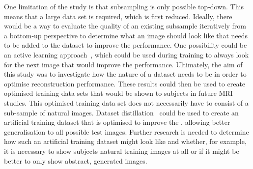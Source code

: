 One limitation of the study is that subsampling is only possible top-down. This means that a large data set is required, which is first reduced. Ideally, there would be a way to evaluate the quality of an existing subsample iteratively from a bottom-up perspective  to determine what an image should look like that needs to be added to the dataset to improve the performance. One possibility could be an active learning approach~\cite{senerActiveLearningConvolutional2018, guoDeepCoreComprehensiveLibrary2022}, which could be used during training to always look for the next image that would improve the performance. Ultimately, the aim of this study was to investigate how the nature of a dataset needs to be in order to optimise reconstruction performance. These results could then be used to create optimised training data sets that would be shown to subjects in future MRI studies. This optimised training data set does not necessarily have to consist of a sub-sample of natural images. Dataset distillation~\cite{wangDatasetDistillation2018,yuDatasetDistillationComprehensive2024} could be used to create an artificial training dataset that is optimised to improve the , allowing better generalisation to all possible test images. Further research is needed to determine how such an artificial training dataset might look like and whether, for example, it is necessary to show subjects natural training images at all or if it might be better to only show abstract, generated images. 




